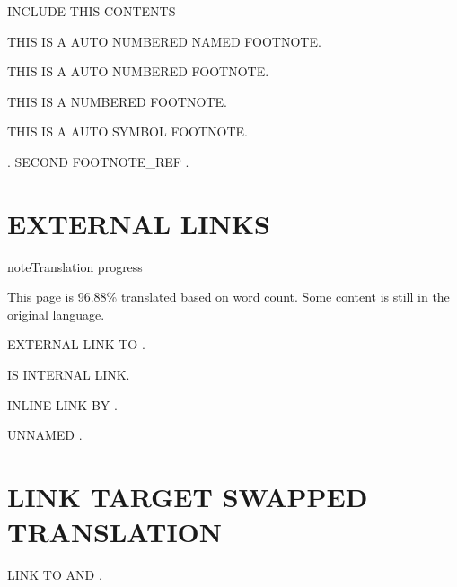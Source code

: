 \documentclass[letterpaper,10pt,english]{sphinxmanual}
\begin{document}
\sphinxAtStartPar
{\hyperref[\detokenize{footnote:i18n-with-footnote}]{}} INCLUDE THIS CONTENTS %
\begin{footnote}[2]\sphinxAtStartFootnote
THIS IS A AUTO NUMBERED NAMED FOOTNOTE.
%
\end{footnote}  %
\begin{footnote}[1]\sphinxAtStartFootnote
THIS IS A AUTO NUMBERED FOOTNOTE.
%
\end{footnote} %
\begin{footnote}[100]\sphinxAtStartFootnote
THIS IS A NUMBERED FOOTNOTE.
%
\end{footnote} %
\begin{footnote}[*]\sphinxAtStartFootnote
THIS IS A AUTO SYMBOL FOOTNOTE.
%
\end{footnote}. SECOND FOOTNOTE\_REF \sphinxfootnotemark[100].

\sphinxstepscope


\chapter{EXTERNAL LINKS}
\label{\detokenize{external_links:i18n-with-external-links}}\label{\detokenize{external_links::doc}}
\begin{sphinxadmonition}{note}{Translation progress}

\sphinxAtStartPar
This page is 96.88\% translated based on word count. Some content is still in the original language.
\end{sphinxadmonition}

\sphinxAtStartPar
EXTERNAL LINK TO .

\sphinxAtStartPar
{\hyperref[\detokenize{external_links:i18n-with-external-links}]{}} IS INTERNAL LINK.

\sphinxAtStartPar
INLINE LINK BY .

\sphinxAtStartPar
UNNAMED .


\chapter{LINK TARGET SWAPPED TRANSLATION}
\label{\detokenize{external_links:link-target-swapped-translation}}
\sphinxAtStartPar
LINK TO  AND .
\end{document}
